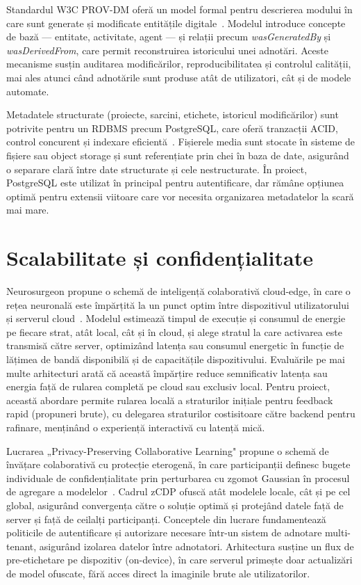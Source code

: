 Standardul W3C PROV-DM oferă un model formal pentru descrierea modului în care sunt generate și modificate entitățile digitale~\cite{Moreau2013PROVDM}. Modelul introduce concepte de bază — entitate, activitate, agent — și relații precum \textit{wasGeneratedBy} și \textit{wasDerivedFrom}, care permit reconstruirea istoricului unei adnotări. Aceste mecanisme susțin auditarea modificărilor, reproducibilitatea și controlul calității, mai ales atunci când adnotările sunt produse atât de utilizatori, cât și de modele automate.

Metadatele structurate (proiecte, sarcini, etichete, istoricul modificărilor) sunt potrivite pentru un RDBMS precum PostgreSQL, care oferă tranzacții ACID, control concurent și indexare eficientă~\cite{postgresql_docs}. Fișierele media sunt stocate în sisteme de fișiere sau object storage și sunt referențiate prin chei în baza de date, asigurând o separare clară între date structurate și cele nestructurate. În proiect, PostgreSQL este utilizat în principal pentru autentificare, dar rămâne opțiunea optimă pentru extensii viitoare care vor necesita organizarea metadatelor la scară mai mare.

\section{Scalabilitate și confidențialitate}

Neurosurgeon propune o schemă de inteligență colaborativă cloud-edge, în care o rețea neuronală este împărțită la un punct optim între dispozitivul utilizatorului și serverul cloud~\cite{10.1145/3037697.3037698}. Modelul estimează timpul de execuție și consumul de energie pe fiecare strat, atât local, cât și în cloud, și alege stratul la care activarea este transmisă către server, optimizând latența sau consumul energetic în funcție de lățimea de bandă disponibilă și de capacitățile dispozitivului. Evaluările pe mai multe arhitecturi arată că această împărțire reduce semnificativ latența sau energia față de rularea completă pe cloud sau exclusiv local. Pentru proiect, această abordare permite rularea locală a straturilor inițiale pentru feedback rapid (propuneri brute), cu delegarea straturilor costisitoare către backend pentru rafinare, menținând o experiență interactivă cu latență mică.

Lucrarea „Privacy-Preserving Collaborative Learning" propune o schemă de învățare colaborativă cu protecție eterogenă, în care participanții definesc bugete individuale de confidențialitate prin perturbarea cu zgomot Gaussian în procesul de agregare a modelelor~\cite{10163938}. Cadrul zCDP ofuscă atât modelele locale, cât și pe cel global, asigurând convergența către o soluție optimă și protejând datele față de server și față de ceilalți participanți. Conceptele din lucrare fundamentează politicile de autentificare și autorizare necesare într-un sistem de adnotare multi-tenant, asigurând izolarea datelor între adnotatori. Arhitectura susține un flux de pre-etichetare pe dispozitiv (on-device), în care serverul primește doar actualizări de model ofuscate, fără acces direct la imaginile brute ale utilizatorilor.